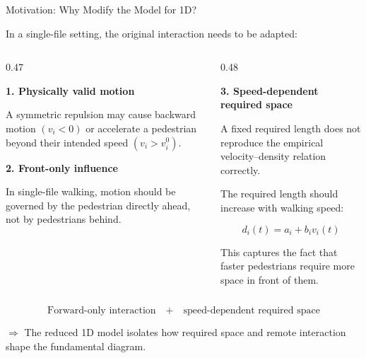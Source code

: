 \documentclass{beamer}
\begin{document}
\begin{frame}{Motivation: Why Modify the Model for 1D?}

{\footnotesize
\raggedright
\setlength{\baselineskip}{0.90\baselineskip}

In a single-file setting, the original interaction needs to be adapted:

\vspace{0.12cm}

\begin{columns}[T,onlytextwidth]

    \begin{column}{0.47\textwidth}

        \textbf{1. Physically valid motion}

        A symmetric repulsion may cause backward motion
        $(v_i < 0)$ or accelerate a pedestrian beyond their intended
        speed $(v_i > v_i^0)$.

        \vspace{0.25cm}

        \textbf{2. Front-only influence}

        In single-file walking, motion should be governed by the
        pedestrian directly ahead, not by pedestrians behind.

    \end{column}

    \hfill

    \begin{column}{0.48\textwidth}

        \textbf{3. Speed-dependent required space}

        A fixed required length does not reproduce the empirical
        velocity--density relation correctly.

        \vspace{0.12cm}

        The required length should increase with walking speed:

        \[
            d_i(t)=a_i+b_i v_i(t)
        \]

        \vspace{0.05cm}

        This captures the fact that faster pedestrians require more
        space in front of them.

    \end{column}

\end{columns}

\vspace{0.18cm}

\[
\boxed{
\text{Forward-only interaction}
\quad + \quad
\text{speed-dependent required space}
}
\]

\vspace{0.05cm}

$\Rightarrow$ The reduced 1D model isolates how required space and
remote interaction shape the fundamental diagram.

}

\end{frame}
\end{document}

